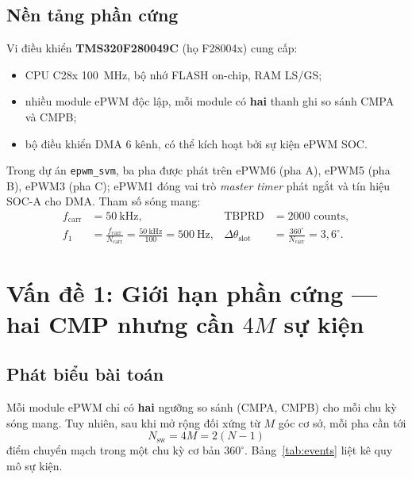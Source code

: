 \documentclass[12pt,a4paper]{article}
\begin{document}
\subsection{Nền tảng phần cứng}

Vi điều khiển \textbf{TMS320F280049C} (họ F28004x) cung cấp:
\begin{itemize}[noitemsep]
  \item CPU C28x \SI{100}{\mega\hertz}, bộ nhớ FLASH on-chip, RAM LS/GS;
  \item nhiều module ePWM độc lập, mỗi module có \textbf{hai} thanh ghi so sánh CMPA và CMPB;
  \item bộ điều khiển DMA 6 kênh, có thể kích hoạt bởi sự kiện ePWM SOC.
\end{itemize}

Trong dự án \texttt{epwm\_svm}, ba pha được phát trên ePWM6 (pha A), ePWM5 (pha B), ePWM3 (pha C); ePWM1 đóng vai trò \emph{master timer} phát ngắt và tín hiệu SOC-A cho DMA. Tham số sóng mang:
\begin{align}
  f_{\mathrm{carr}} &= \SI{50}{\kilo\hertz}, &
  \mathrm{TBPRD} &= 2000 \text{ counts}, \\
  f_1 &= \frac{f_{\mathrm{carr}}}{N_{\mathrm{carr}}} = \frac{\SI{50}{\kilo\hertz}}{100} = \SI{500}{\hertz}, &
  \Delta\theta_{\mathrm{slot}} &= \frac{360^\circ}{N_{\mathrm{carr}}} = 3{,}6^\circ.
  \label{eq:timing}
\end{align}

\section{Vấn đề 1: Giới hạn phần cứng --- hai CMP nhưng cần $4M$ sự kiện}

\subsection{Phát biểu bài toán}

Mỗi module ePWM chỉ có \textbf{hai} ngưỡng so sánh (CMPA, CMPB) cho mỗi chu kỳ sóng mang. Tuy nhiên, sau khi mở rộng đối xứng từ $M$ góc cơ sở, mỗi pha cần tới
\begin{equation}
  N_{\mathrm{sw}} = 4M = 2(N-1)
  \label{eq:4M}
\end{equation}
điểm chuyển mạch trong một chu kỳ cơ bản $360^\circ$. Bảng~\ref{tab:events} liệt kê quy mô sự kiện.
\end{document}
